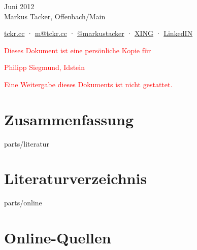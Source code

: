 \documentclass[11pt,a4paper]{article}
\newcommand{\person}{Philipp Siegmund, Idstein}
\begin{document}



\begin{center}

Juni 2012\\
Markus Tacker, Offenbach/Main

\begin{small}
\href{http://tckr.cc/}{tckr.cc} · \href{mailto:m@tckr.cc}{m@tckr.cc} · \href{http://twitter.com/markustacker}{@markustacker} · \href{https://www.xing.com/profile/Markus_Tacker}{XING} · \href{http://www.linkedin.com/in/markustacker}{LinkedIN}
\end{small}

\vspace{2cm}

\textcolor{red}{Dieses Dokument ist eine persönliche Kopie für}

\begin{large}
\textcolor{red}{\person}
\end{large}

\textcolor{red}{Eine Weitergabe dieses Dokuments ist nicht gestattet.}

\end{center}

\pagebreak

\section*{Zusammenfassung}



\pagebreak



\setcounter{page}{1}

















\pagebreak

\mbox{}

\pagebreak

\begin{btSect}{parts/literatur}
\section*{Literaturverzeichnis}
\btPrintCited
\end{btSect}
\begin{btSect}{parts/online}
\section*{Online-Quellen}
\btPrintCited
\end{btSect}
\end{document}
